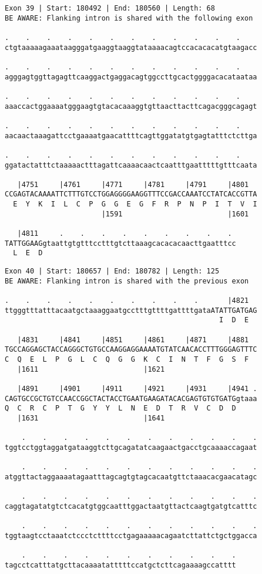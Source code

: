 \documentclass{article}
\begin{document}
\newpage
\begin{Verbatim}
Exon 39 | Start: 180492 | End: 180560 | Length: 68
BE AWARE: Flanking intron is shared with the following exon
 
.    .    .    .    .    .    .    .    .    .    .    .    
ctgtaaaaagaaataagggatgaaggtaaggtataaaacagtccacacacatgtaagacc
  
.    .    .    .    .    .    .    .    .    .    .    .    
agggagtggttagagttcaaggactgaggacagtggccttgcactggggacacataataa
  
.    .    .    .    .    .    .    .    .    .    .    .    
aaaccactggaaaatgggaagtgtacacaaaggtgttaacttacttcagacgggcagagt
  
.    .    .    .    .    .    .    .    .    .    .    .    
aacaactaaagattcctgaaaatgaacattttcagttggatatgtgagtatttctcttga
  
.    .    .    .    .    .    .    .    .    .    .    .    
ggatactatttctaaaaactttagattcaaaacaactcaatttgaatttttgtttcaata
  
   |4751     |4761     |4771     |4781     |4791     |4801  
CCGAGTACAAAATTCTTTGTCCTGGAGGGGAAGGTTTCCGACCAAATCCTATCACCGTTA
  E  Y  K  I  L  C  P  G  G  E  G  F  R  P  N  P  I  T  V  I
                       |1591                         |1601  
  
   |4811     .    .    .    .    .    .    .    .    . 
TATTGGAAGgtaattgtgtttcctttgtcttaaagcacacacaacttgaatttcc
  L  E  D                                              
\end{Verbatim}
\newpage
\begin{Verbatim}
Exon 40 | Start: 180657 | End: 180782 | Length: 125
BE AWARE: Flanking intron is shared with the previous exon
 
.    .    .    .    .    .    .    .    .    .       |4821  
ttgggtttatttacaatgctaaaggaatgcctttgttttgattttgataATATTGATGAG
                                                   I  D  E  
  
   |4831     |4841     |4851     |4861     |4871     |4881  
TGCCAGGAGCTACCAGGGCTGTGCCAAGGAGGAAAATGTATCAACACCTTTGGGAGTTTC
C  Q  E  L  P  G  L  C  Q  G  G  K  C  I  N  T  F  G  S  F  
   |1611                         |1621                      
  
   |4891     |4901     |4911     |4921     |4931     |4941 .
CAGTGCCGCTGTCCAACCGGCTACTACCTGAATGAAGATACACGAGTGTGTGATGgtaaa
Q  C  R  C  P  T  G  Y  Y  L  N  E  D  T  R  V  C  D  D     
   |1631                         |1641                      
  
    .    .    .    .    .    .    .    .    .    .    .    .
tggtcctggtaggatgataaggtcttgcagatatcaagaactgacctgcaaaaccagaat
  
    .    .    .    .    .    .    .    .    .    .    .    .
atggttactaggaaaatagaatttagcagtgtagcacaatgttctaaacacgaacatagc
  
    .    .    .    .    .    .    .    .    .    .    .    .
caggtagatatgtctcacatgtggcaatttggactaatgttactcaagtgatgtcatttc
  
    .    .    .    .    .    .    .    .    .    .    .    .
tggtaagtcctaaatctccctcttttcctgagaaaaacagaatcttattctgctggacca
  
    .    .    .    .    .    .    .    .    .    .    .
tagcctcatttatgcttacaaaatatttttccatgctcttcagaaaagccatttt
\end{Verbatim}
\end{document}
